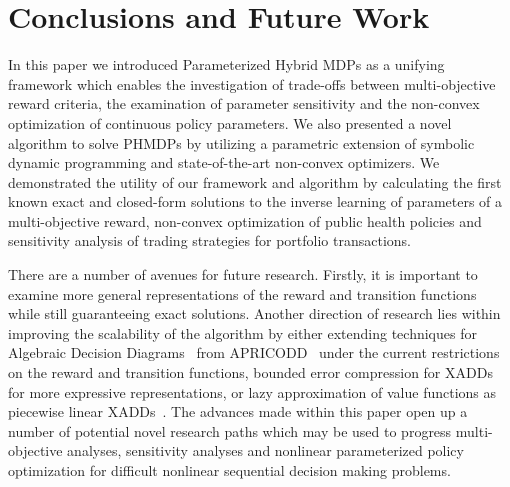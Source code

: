 \section{Conclusions and Future Work}
\label{sec:conclusion}

In this paper we introduced Parameterized Hybrid MDPs as a unifying framework which enables the investigation of trade-offs between multi-objective reward criteria, the examination of parameter sensitivity and the non-convex optimization of continuous policy parameters. We also presented a novel algorithm to solve PHMDPs by utilizing a parametric extension of symbolic dynamic programming and state-of-the-art non-convex optimizers. We demonstrated the utility of our framework and algorithm by calculating the first known exact and closed-form solutions to the inverse learning of parameters of a multi-objective reward, non-convex optimization of public health policies and sensitivity analysis of trading strategies for portfolio transactions.

There are a number of avenues for future research. Firstly, it is important to examine more general representations of the reward and transition functions while still guaranteeing exact solutions. Another direction of research lies within improving the scalability of the algorithm by either extending techniques for Algebraic Decision Diagrams~\parencite{Bahar_JoFMiSD_1993} from APRICODD~\parencite{St-Aubin_NIPS_2000} under the current restrictions on the reward and transition functions, bounded error compression for XADDs~\parencite{Vianna_UAI_2013} for more expressive representations, or lazy approximation of value functions as piecewise linear XADDs~\parencite{Li_AAAI_2005}. The advances made within this paper open up a number of potential novel research paths which may be used to progress multi-objective analyses, sensitivity analyses and nonlinear parameterized policy optimization for difficult nonlinear sequential decision making problems.
